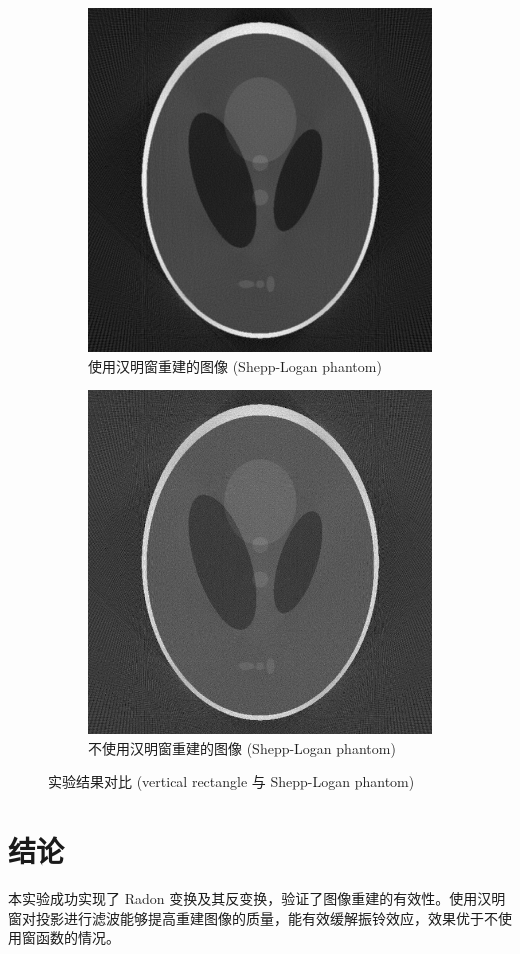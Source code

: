 \documentclass{article}
\begin{document}
\begin{figure}[H]
    \begin{subfigure}{0.45\textwidth}
        \includegraphics[width=\textwidth]{../result_3_4/shepp_logan_reconstructed_hamming.png}
        \caption{使用汉明窗重建的图像 (Shepp-Logan phantom)}
    \end{subfigure}
    \hfill
    \begin{subfigure}{0.45\textwidth}
        \includegraphics[width=\textwidth]{../result_3_4/shepp_logan_reconstructed_no_hamming.png}
        \caption{不使用汉明窗重建的图像 (Shepp-Logan phantom)}
    \end{subfigure}
    \caption{实验结果对比 (vertical rectangle 与 Shepp-Logan phantom)}
\end{figure}

\section{结论}
本实验成功实现了 Radon 变换及其反变换，验证了图像重建的有效性。使用汉明窗对投影进行滤波能够提高重建图像的质量，能有效缓解振铃效应，效果优于不使用窗函数的情况。
\end{document}
